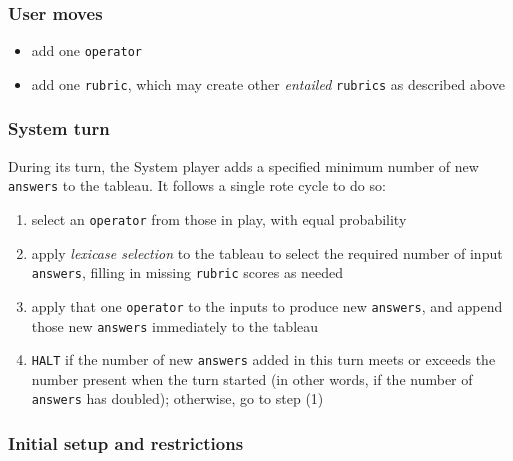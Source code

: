 \subsubsection{User moves}\hypertarget{user-moves}{}\label{user-moves}

\begin{itemize}
\item add one {\tt operator}
\item add one {\tt rubric}, which may create other \emph{entailed} {\tt rubrics} as described above
\end{itemize}

\subsubsection{System turn}\hypertarget{system-turn}{}\label{system-turn}

During its turn, the System player adds a specified minimum number of new {\tt answers} to the tableau. It follows a single rote cycle to do so:

\begin{enumerate}
\item select an {\tt operator} from those in play, with equal probability
\item apply \emph{lexicase selection} to the tableau to select the required number of input {\tt answers}, filling in missing {\tt rubric} scores as needed
\item apply that one {\tt operator} to the inputs to produce new {\tt answers}, and append those new {\tt answers} immediately to the tableau
\item {\tt HALT} if the number of new {\tt answers} added in this turn meets or exceeds the number present when the turn started (in other words, if the number of {\tt answers} has doubled); otherwise, go to step (1)
\end{enumerate}

\subsubsection{Initial setup and restrictions}\hypertarget{initial-setup-and-restrictions}{}\label{initial-setup-and-restrictions}

